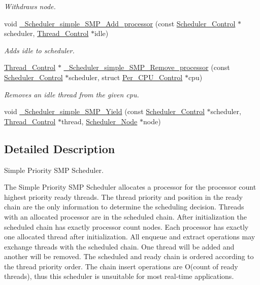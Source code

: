 \begin{DoxyCompactItemize}
\begin{DoxyCompactList}\small\item\em Withdraws node. \end{DoxyCompactList}\item 
void \mbox{\hyperlink{group__RTEMSScoreSchedulerSMPSimple_gaf9fb154102db78fc836752db9941e8c2}{\+\_\+\+Scheduler\+\_\+simple\+\_\+\+S\+M\+P\+\_\+\+Add\+\_\+processor}} (const \mbox{\hyperlink{struct__Scheduler__Control}{Scheduler\+\_\+\+Control}} $\ast$scheduler, \mbox{\hyperlink{struct__Thread__Control}{Thread\+\_\+\+Control}} $\ast$idle)
\begin{DoxyCompactList}\small\item\em Adds {\itshape idle} to {\itshape scheduler}. \end{DoxyCompactList}\item 
\mbox{\hyperlink{struct__Thread__Control}{Thread\+\_\+\+Control}} $\ast$ \mbox{\hyperlink{group__RTEMSScoreSchedulerSMPSimple_ga65258eebe7ddb8d85e105b8f734c80ae}{\+\_\+\+Scheduler\+\_\+simple\+\_\+\+S\+M\+P\+\_\+\+Remove\+\_\+processor}} (const \mbox{\hyperlink{struct__Scheduler__Control}{Scheduler\+\_\+\+Control}} $\ast$scheduler, struct \mbox{\hyperlink{structPer__CPU__Control}{Per\+\_\+\+C\+P\+U\+\_\+\+Control}} $\ast$cpu)
\begin{DoxyCompactList}\small\item\em Removes an idle thread from the given cpu. \end{DoxyCompactList}\item 
void \mbox{\hyperlink{group__RTEMSScoreSchedulerSMPSimple_ga879b21f227bb726623e21ff246c44b45}{\+\_\+\+Scheduler\+\_\+simple\+\_\+\+S\+M\+P\+\_\+\+Yield}} (const \mbox{\hyperlink{struct__Scheduler__Control}{Scheduler\+\_\+\+Control}} $\ast$scheduler, \mbox{\hyperlink{struct__Thread__Control}{Thread\+\_\+\+Control}} $\ast$thread, \mbox{\hyperlink{structScheduler__Node}{Scheduler\+\_\+\+Node}} $\ast$node)
\end{DoxyCompactItemize}


\subsection{Detailed Description}
Simple Priority S\+MP Scheduler. 

The Simple Priority S\+MP Scheduler allocates a processor for the processor count highest priority ready threads. The thread priority and position in the ready chain are the only information to determine the scheduling decision. Threads with an allocated processor are in the scheduled chain. After initialization the scheduled chain has exactly processor count nodes. Each processor has exactly one allocated thread after initialization. All enqueue and extract operations may exchange threads with the scheduled chain. One thread will be added and another will be removed. The scheduled and ready chain is ordered according to the thread priority order. The chain insert operations are O(count of ready threads), thus this scheduler is unsuitable for most real-\/time applications.

